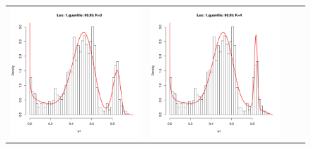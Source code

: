 \begin{figure}[h]
\begin{tabular}{cccc}
\includegraphics[width=\textwidth/4]{../img/loc1/quantile90/fit_K3_BFGS.pdf}
&
\includegraphics[width=\textwidth/4]{../img/loc1/quantile90/fit_K4_BFGS.pdf}

\end{tabular}
\end{figure}
